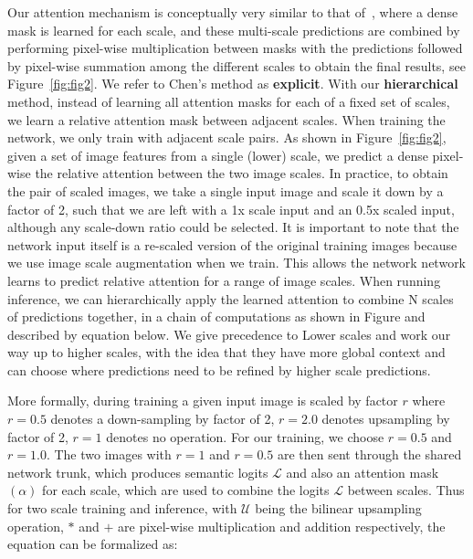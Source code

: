 \documentclass{article}
\begin{document}
Our attention mechanism is conceptually very similar to that of~\cite{chen2015attention}, where a dense mask is learned for each scale, and these multi-scale predictions are combined by performing pixel-wise multiplication between masks with the predictions followed by pixel-wise summation among the different scales to obtain the final results, see Figure~\ref{fig:fig2}. We refer to Chen's method as \textbf{explicit}. With our \textbf{hierarchical} method, instead of learning all attention masks for each of a fixed set of scales, we learn a relative attention mask between adjacent scales. When training the network, we only train with adjacent scale pairs. As shown in Figure~\ref{fig:fig2}, given a set of image features from a single (lower) scale, we predict a dense pixel-wise the relative attention between the two image scales. In practice, to obtain the pair of scaled images, we take a single input image and scale it down by a factor of 2, such that we are left with a 1x scale input and an 0.5x scaled input, although any scale-down ratio could be selected. It is important to note that the network input itself is a re-scaled version of the original training images because we use image scale augmentation when we train. This allows the network network learns to predict relative attention for a range of image scales. When running inference, we can hierarchically apply the learned attention to combine N scales of predictions together, in a chain of computations as shown in Figure and described by equation below. We give precedence to Lower scales and work our way up to higher scales, with the idea that they have more global context and can choose where predictions need to be refined by higher scale predictions.

More formally, during training a given input image is scaled by factor $r$ where $r=0.5$ denotes a down-sampling by factor of 2, $r=2.0$ denotes upsampling by factor of 2, $r=1$ denotes no operation. For our training, we choose $r=0.5$ and $r=1.0$. The two images with $r=1$ and $r=0.5$ are then sent through the shared network trunk, which produces semantic logits $\mathcal{L}$ and also an attention mask$(\alpha)$ for each scale, which are used to combine the logits $\mathcal{L}$ between scales. Thus for two scale training and inference, with $\mathcal{U}$ being the bilinear upsampling operation, $*$  and $+$ are pixel-wise multiplication and addition respectively, the equation can be formalized as:
\end{document}
